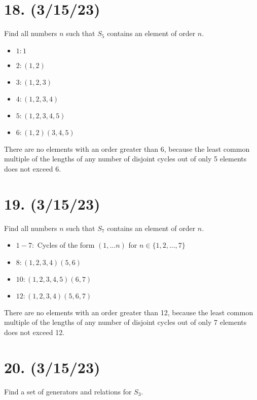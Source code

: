 \documentclass{article}
\begin{document}
\section*{18. (3/15/23)}

Find all numbers $n$ such that $S_5$ contains an element of order $n$.

\begin{itemize}[itemsep=0em]
    \item $1: 1$
    \item $2: (1, 2)$
    \item $3: (1, 2, 3)$
    \item $4: (1, 2, 3, 4)$
    \item $5: (1, 2, 3, 4, 5)$
    \item $6: (1, 2)(3, 4, 5)$
\end{itemize}

There are no elements with an order greater than 6, because the least common multiple of the lengths of any number of disjoint cycles out of only 5 elements does not exceed 6.

\section*{19. (3/15/23)}

Find all numbers $n$ such that $S_7$ contains an element of order $n$.

\begin{itemize}[itemsep=0em]
    \item $1-7:$ Cycles of the form $(1, ... n)$ for $n \in \{1, 2, ..., 7\}$
    \item $8: (1, 2, 3, 4)(5, 6)$
    \item $10: (1, 2, 3, 4, 5)(6, 7)$
    \item $12: (1, 2, 3, 4)(5, 6, 7)$
\end{itemize}

There are no elements with an order greater than 12, because the least common multiple of the lengths of any number of disjoint cycles out of only 7 elements does not exceed 12.

\section*{20. (3/15/23)}

Find a set of generators and relations for $S_3$.
\end{document}
